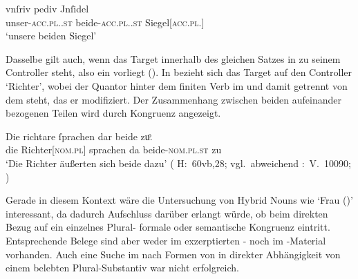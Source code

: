 \begin{exe}
\ex \label{ex:gendassgmt1_txt}
	\gll vnſriv pediv Jnſidel \\
		unser-\textsc{acc.pl.\NeutI.st} beide-\textsc{acc.pl.\NeutI.st}
			Siegel[\textsc{acc.pl.\NeutI}] \\
	\trans `unsere beiden Siegel'
		\parencites(Nr.~3224~A, Freising, 1299)[400,12--13]{cao4}
\end{exe}


Dasselbe gilt auch, wenn das Target innerhalb des gleichen Satzes in
 zu seinem Controller steht, also ein
 vorliegt (). In
 bezieht sich das Target  auf den Controller
 `Richter', wobei der Quantor hinter dem finiten Verb im
 und damit getrennt von dem  steht, das er
modifiziert. Der Zusammenhang zwischen beiden aufeinander
bezogenen Teilen wird durch Kongruenz angezeigt.

\begin{exe}
\ex \label{ex:gendassgmt2}
	\gll Die richtare ſprachen dar beide zuͦ. \\
		die Richter[\textsc{nom.pl\subM}] sprachen da
		beide-\textsc{nom.pl\subM.st} zu \\
	\trans `Die Richter äußerten sich beide dazu'
		(%
			H:~60vb,28; vgl.~abweichend
			\KC:~V.~10090;
			\cite[267]{schroeder1895}%
		)
\end{exe}

Gerade in diesem Kontext wäre die Untersuchung von Hybrid Nouns wie 
`Frau (\NeutF)' interessant, da dadurch Aufschluss darüber
erlangt würde, ob beim direkten Bezug auf ein einzelnes Plural-
formale oder semantische
Kongruenz eintritt. Entsprechende Belege sind aber
weder im exzerptierten \CAO{}- noch im \KC{}-Material vorhanden. Auch eine
Suche im \REM{} nach Formen von  in direkter Abhängigkeit von einem
belebten Plural-Substantiv war nicht erfolgreich.

